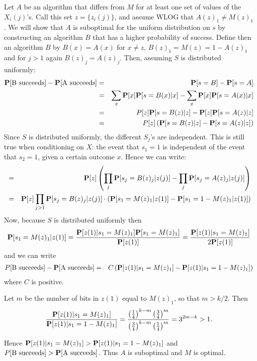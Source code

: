 \documentclass[11pt]{article} \usepackage{amssymb}
\begin{document}
\begin{itemize}
Let $A$ be an algorithm that differs from $M$ for at least one set of values of
the $X_i(j)$'s. Call this set $z=\{z_i(j)\}$, and assume WLOG that $A(z)_1\neq M(z)_1$. We
will show that $A$ is suboptimal for the uniform distribution on $s$ by 
constructing an algorithm $B$ that has a higher probability of success.
Define then an algorithm $B$ by
$B(x)=A(x)$ for $x\neq z$,  $B(z)_1=M(z)=1- A(z)_1$ and for $j>1$ again
$B(z)_j=A(z)_j$. Then, assuming $S$ is distributed uniformly:
\begin{eqnarray*}
\P[\mbox{B succeeds}]-\P[\mbox{A succeeds}] &=&
\P[s=B]-\P[s=A]
\\ &=& \sum_x\P[x]\P[s=B(x)|x]-\sum_x\P[x]\P[s=A(x)|x]
\\ &=& P[z]\P[s=B(z)|z]-\P[z]\P[s=A(z)|z]
\\ &=& P[z]\left(\P[s=B(z)|z]-\P[s=A(z)|z]\right)
\end{eqnarray*}
Since $S$ is distributed uniformly, the different $S_j$'s are independent. This
is still true when conditioning on $X$: the event that $s_1=1$ is independent 
of the event that $s_2=1$, given a certain outcome $x$.
Hence we can write:
\begin{eqnarray*}
 &=& \P[z]\left(\prod_j\P[s_j=B(z)_j|z(j)]-\prod_j\P[s_j=A(z)_j|z(j)]\right)
\\ &=& \P[z]\prod_{j>1}\P[s_j=B(z)_j|z(j)]\cdot\left(\P[s_1=M(z)_1|z(1)]-\P[s_1=1-M(z)_1|z(1)]\right)
\end{eqnarray*}
Now, because $S$ is distributed uniformly then
\begin{eqnarray*}
  \P[s_1=M(z)_1|z(1)] = {\P[z(1)|s_1=M(z)_1]\P[s_1=M(z)_1]\over \P[z(1)]}
  = {\P[z(1)|s_1=M(z)_1]\over 2\P[z(1)]}
\end{eqnarray*}
and we can write
\begin{eqnarray*}
P[\mbox{B succeeds}]-\P[\mbox{A succeeds}]
 &=&  
C\left(\P[z(1)|s_1=M(z)_1]-\P[z(1)|s_1=1-M(z)_1]\right)
\end{eqnarray*}
where $C$ is positive. 

Let $m$ be the number of bits in $z(1)$ equal to $M(z)_1$, so that $m > k/2$. Then
\begin{eqnarray*}
  {\P[z(1)|s_1=M(z)_1] \over \P[z(1)|s_1=1-M(z)_1]} =
{\left({1\over 4}\right)^{k-m}\left({3\over 4}\right)^{m}
  \over 
\left({3\over 4}\right)^{k-m}\left({1\over 4}\right)^{m}
}
= 3^{2m-k}
>1.
\end{eqnarray*}

 Hence $\P[z(1)|s_1=M(z)_1] > \P[z(1)|s_1=1-M(z)_1]$ and 
$P[\mbox{B succeeds}] > \P[\mbox{A succeeds}]$. Thus $A$ is suboptimal and $M$ is optimal.


\end{itemize}
\end{document}
